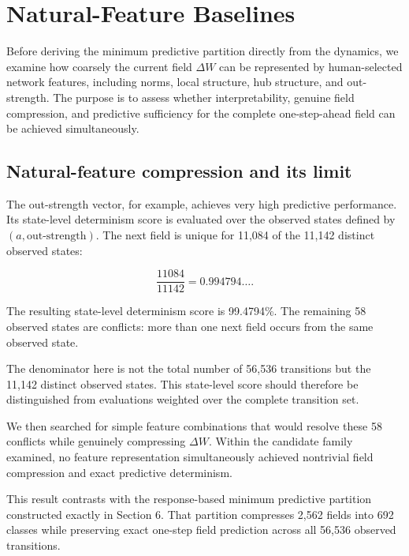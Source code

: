 \documentclass[
  11pt,
]{article}
\begin{document}
\hypertarget{natural-feature-baselines}{%
\section{Natural-Feature Baselines}\label{natural-feature-baselines}}

Before deriving the minimum predictive partition directly from the
dynamics, we examine how coarsely the current field \({\Delta W}\) can
be represented by human-selected network features, including norms,
local structure, hub structure, and out-strength. The purpose is to
assess whether interpretability, genuine field compression, and
predictive sufficiency for the complete one-step-ahead field can be
achieved simultaneously.

\hypertarget{natural-feature-compression-and-its-limit}{%
\subsection{Natural-feature compression and its
limit}\label{natural-feature-compression-and-its-limit}}

The out-strength vector, for example, achieves very high predictive
performance. Its state-level determinism score is evaluated over the
observed states defined by \({(a,\mathrm{out\mbox{-}strength})}\). The
next field is unique for 11,084 of the 11,142 distinct observed states:

\[{\frac{11084}{11142}=0.994794\ldots.}\]

The resulting state-level determinism score is 99.4794\%. The remaining
58 observed states are conflicts: more than one next field occurs from
the same observed state.

The denominator here is not the total number of 56,536 transitions but
the 11,142 distinct observed states. This state-level score should
therefore be distinguished from evaluations weighted over the complete
transition set.

We then searched for simple feature combinations that would resolve
these 58 conflicts while genuinely compressing \({\Delta W}\). Within
the candidate family examined, no feature representation simultaneously
achieved nontrivial field compression and exact predictive determinism.

This result contrasts with the response-based minimum predictive
partition constructed exactly in Section 6. That partition compresses
2,562 fields into 692 classes while preserving exact one-step field
prediction across all 56,536 observed transitions.
\end{document}
